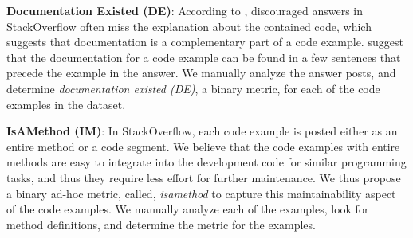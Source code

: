 \documentclass[conference]{IEEEtran}
\makeatletter
\newcommand\latinabbrev[1]{
  \peek_meaning:NTF . {%
    #1\@}%
  { \peek_catcode:NTF a {%
      #1., \@ }%
    {#1., \@}}}
\def\ie{\latinabbrev{i.e}}
\makeatother
\begin{document}

\textbf{Documentation Existed (DE)}: According to \citet{nasehi}, discouraged answers in StackOverflow often miss the explanation about the contained code, which suggests that documentation is a complementary part of a code example.
\citet{autocomm} suggest that the documentation for a code example can be found in a few sentences that precede the example in the answer. We manually analyze the answer posts, and determine \emph{documentation existed (DE)}, a binary metric, for each of the code examples in the dataset. 

\textbf{IsAMethod (IM)}: In StackOverflow, each code example is posted either as an entire method or a code segment. We believe that the code examples with entire methods are easy to integrate into the development code for similar programming tasks, and thus they require less effort for further maintenance.
We thus propose a binary ad-hoc metric, called, \emph{isamethod} to capture this maintainability aspect of the code examples.  We manually analyze each of the examples, look for method definitions, and determine the metric for the examples. 
\end{document}
